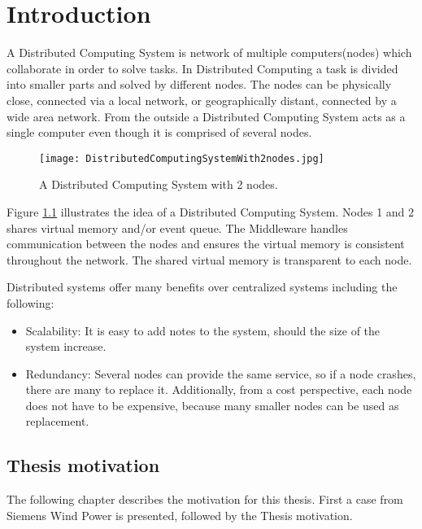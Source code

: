 \chapter{Introduction}

A Distributed Computing System is network of multiple computers(nodes) which collaborate in order to solve tasks. In Distributed Computing a task is divided into smaller parts and solved by different nodes. The nodes can be physically close, connected via a local network, or geographically distant, connected by a wide area network. From the outside a Distributed Computing System acts as a single computer even though it is comprised of several nodes.

\begin{figure}
	\centering
	\texttt{[image: DistributedComputingSystemWith2nodes.jpg]} 
	\caption[Distributed Computing System with 2 nodes]{
		\label{fig:distributedCoputingSystem} 
		\footnotesize{%
			A Distributed Computing System with 2 nodes.
		}
	}
\end{figure}

Figure \cref{fig:distributedCoputingSystem} illustrates the idea of a Distributed Computing System. Nodes 1 and 2 shares virtual memory and/or event queue. The Middleware handles communication between the nodes and ensures the virtual memory is consistent throughout the network. The shared virtual memory is transparent to each node. 

Distributed systems offer many benefits over centralized systems including the following:
\begin{itemize}
	\item Scalability: It is easy to add notes to the system, should the size of the system increase.
	\item Redundancy: Several nodes can provide the same service, so if a node crashes, there are many to replace it. Additionally, from a cost perspective, each node does not have to be expensive, because many smaller nodes can be used as replacement.
\end{itemize}

\section{Thesis motivation}
The following chapter describes the motivation for this thesis. First a case from Siemens Wind Power is presented, followed by the Thesis motivation.

